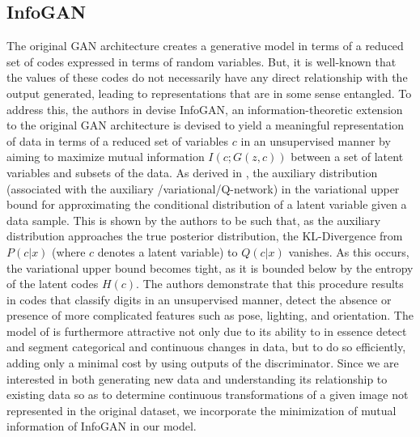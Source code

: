 \documentclass{article}
\begin{document}
\subsection{InfoGAN}\label{igan}
	The original GAN architecture creates a generative model in terms of a reduced set of codes expressed in terms of random variables.  But, it is well-known that the values of these codes do not necessarily have any direct relationship with the output generated, leading to representations that are in some sense entangled.  To address this, the authors in \cite{Chen2016InfoGAN:Nets} devise InfoGAN, an information-theoretic extension to the original GAN architecture is devised to yield a meaningful representation of data in terms of a reduced set of variables $c$ in an unsupervised manner by aiming to maximize mutual information $I(c;G(z,c))$ between a set of latent variables and subsets of the data.  As derived in \cite{Chen2016InfoGAN:Nets}, the auxiliary distribution (associated with the auxiliary /variational/Q-network) in the variational upper bound for approximating the conditional distribution of a latent variable given a data sample. This is shown by the authors to be such that, as the auxiliary distribution approaches the true posterior distribution, the KL-Divergence from $P(c|x)$ (where $c$ denotes a latent variable) to $Q(c|x)$ vanishes. As this occurs, the variational upper bound becomes tight, as it is bounded below by the entropy of the latent codes $H(c)$.
    The authors demonstrate that this procedure results in codes that classify digits in an unsupervised manner, detect the absence or presence of more complicated features such as pose, lighting, and orientation.  The model of \cite{InfoGAN} is furthermore attractive not only due to its ability to in essence detect and segment categorical and continuous changes in data, but to do so efficiently, adding only a minimal cost by using outputs of the discriminator.  Since we are interested in both generating new data and understanding its relationship to existing data so as to determine continuous transformations of a given image not represented in the original dataset, we incorporate the minimization of mutual information of InfoGAN in our model. 
\end{document}
